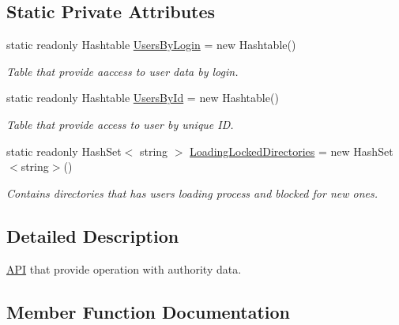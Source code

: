 \subsection*{Static Private Attributes}
\begin{DoxyCompactItemize}
\item 
static readonly Hashtable \mbox{\hyperlink{class_authority_controller_1_1_a_p_i_1_1_users_a7e3706be7a0bf67293b57287db85c86f}{Users\+By\+Login}} = new Hashtable()
\begin{DoxyCompactList}\small\item\em Table that provide aaccess to user data by login. \end{DoxyCompactList}\item 
static readonly Hashtable \mbox{\hyperlink{class_authority_controller_1_1_a_p_i_1_1_users_a579a2f121cc7b767fbcd33279121e2ed}{Users\+By\+Id}} = new Hashtable()
\begin{DoxyCompactList}\small\item\em Table that provide access to user by unique ID. \end{DoxyCompactList}\item 
static readonly Hash\+Set$<$ string $>$ \mbox{\hyperlink{class_authority_controller_1_1_a_p_i_1_1_users_aed715cb6e26d7333f4ae338413460321}{Loading\+Locked\+Directories}} = new Hash\+Set$<$string$>$()
\begin{DoxyCompactList}\small\item\em Contains directories that has users loading process and blocked for new ones. \end{DoxyCompactList}\end{DoxyCompactItemize}


\subsection{Detailed Description}
\mbox{\hyperlink{namespace_authority_controller_1_1_a_p_i}{A\+PI}} that provide operation with authority data. 



\subsection{Member Function Documentation}
\mbox{\label{class_authority_controller_1_1_a_p_i_1_1_users_a9cdaba595a8b1d2e49690bebeca969d2}} 
